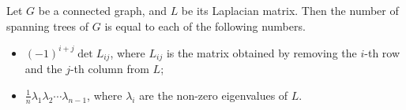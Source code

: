 \begin{thm}[Kirchhoff]
Let $G$ be a connected graph, and $L$ be its Laplacian matrix.
Then the number of spanning trees of $G$ is equal to each of the following numbers.
\begin{itemize}
\item $(-1)^{i+j} \det L_{ij}$, where $L_{ij}$ is the matrix obtained by removing the $i$-th row and the $j$-th column from $L$;
\item $\frac{1}{n} \lambda_1 \lambda_2 \cdots \lambda_{n-1}$, where $\lambda_i$ are the non-zero eigenvalues of $L$.
\end{itemize}
\end{thm}